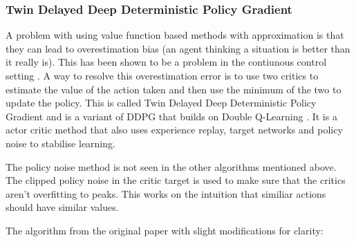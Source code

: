 \subsubsection{Twin Delayed Deep Deterministic Policy Gradient}\label{subsec:TD3}


A problem with using value function based methods with approximation is that they can lead to overestimation bias (an agent thinking a situation is better than it really is). This has been shown to be a problem in the contiunous control setting \cite{fujimotoAddressingFunctionApproximation2018}. A way to resolve this overestimation error is to use two critics to estimate the value of the action taken and then use the minimum of the two to update the policy. This is called Twin Delayed Deep Deterministic Policy Gradient \cite{fujimotoAddressingFunctionApproximation2018} and is a variant of DDPG \cite{lillicrapContinuousControlDeep2016} that builds on Double Q-Learning \cite{hasseltDeepReinforcementLearning2015}. It is a actor critic method that also uses experience replay, target networks and policy noise to stabilise learning.

The policy noise method is not seen in the other algorithms mentioned above. The clipped policy noise in the critic target is used to make sure that the critics aren't overfitting to peaks. This works on the intuition that similiar actions should have similar values.

The algorithm from the original paper \cite{fujimotoAddressingFunctionApproximation2018} with slight modifications for clarity:

